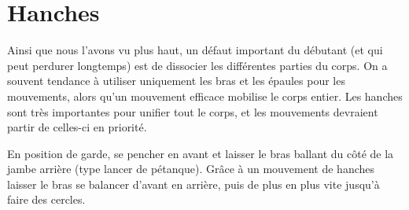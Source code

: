 \section{Hanches}


Ainsi que nous l'avons vu plus haut, un défaut important du débutant (et qui peut perdurer longtemps) est de dissocier les différentes parties du corps.
On a souvent tendance à utiliser uniquement les bras et les épaules pour les mouvements, alors qu'un mouvement efficace mobilise le corps entier.
Les hanches sont très importantes pour unifier tout le corps, et les mouvements devraient partir de celles-ci en priorité.


\begin{exercice}
En position de garde, se pencher en avant et laisser le bras ballant du côté de la jambe arrière (type lancer de pétanque).
Grâce à un mouvement de hanches laisser le bras se balancer d'avant en arrière, puis de plus en plus vite jusqu'à faire des cercles.

\end{exercice}


